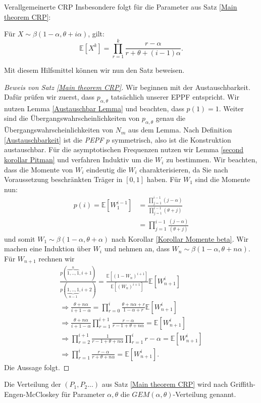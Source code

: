 \begin{section}{Verallgemeinerte CRP}
Insbesondere folgt für die Parameter aus Satz \ref{Main theorem CRP}: 
\begin{Korollar}
    \label{Korollar Momente beta}
    Für $X \sim \beta(1-\alpha,\theta + i\alpha)$, gilt:
    \[
    \mathbb{E}[X^k] = \prod_{r=1}^{k}\frac{r-\alpha}{r+\theta +(i-1)\alpha }.
    \]
\end{Korollar}
Mit diesem Hilfsmittel können wir nun den Satz beweisen.
\begin{proof}[Beweis von Satz \ref{Main theorem CRP}]
   Wir beginnen mit der Austauschbarkeit. Dafür prüfen wir zuerst, dass $p_{\alpha,\theta}$ tatsächlich unserer EPPF entspricht. Wir nutzen Lemma \ref{Austauschbar Lemma} und beachten, dass $p(1) = 1$. Weiter sind die Übergangswahrscheinlichkeiten von $p_{\alpha,\theta}$ genau die Übergangswahrscheinlichkeiten von $N_m$ aus dem Lemma. Nach Definition \ref{Austauschbarkeit} ist die \textit{PEPF} $p$ symmetrisch, also ist die Konstruktion austauschbar. Für die asymptotischen Frequenzen nutzen wir Lemma \ref{second korollar Pitman} und verfahren Induktiv um die $W_i$ zu bestimmen. Wir beachten, dass die Momente von $W_i$ eindeutig die $W_i$ charakterisieren, da Sie nach Voraussetzung beschränkten Träger in $[0,1]$ haben. Für $W_1$ sind die Momente nun:
    \begin{align*}
    p(i)= \mathbb{E}[W_1^{i-1}] &= \frac{\prod_{j=1}^{i-1}(j-\alpha)}{\prod_{j=1}^{i-1}(\theta+j)}\\
    &= \prod_{j=1}^{i-1}\frac{(j-\alpha)}{(\theta+j)}
    \end{align*}
und somit $W_1 \sim \beta(1-\alpha,\theta + \alpha)$ nach Korollar \ref{Korollar Momente beta}. Wir machen eine Induktion über $W_i$ und nehmen an, dass $W_n \sim \beta(1-\alpha,\theta+n\alpha)$. Für $W_{n+1}$ rechnen wir
    \begin{align*}
    \frac{p(\overbrace{1,..,1}^{n},i+1)}{p(\underbrace{1,..,1}_{n-1},i+2)}= \frac{\mathbb{E}[(1-W_n)^{i+1}]}{\mathbb{E}[(W_n)^{i+1}]}\mathbb{E}[W_{n+1}^i] \\
    \Rightarrow \frac{\theta + n\alpha}{i+1-\alpha}=  \prod_{r=0}^{i}\frac{\theta + n\alpha + r}{{1-\alpha + r}}\mathbb{E}[W_{n+1}^i]\\
    \Rightarrow \frac{\theta + n\alpha}{i+1-\alpha}\prod_{r=1}^{i+1}\frac{{r-\alpha }}{ r -1 + \theta + n\alpha }=  \mathbb{E}[W_{n+1}^i]\\
    \Rightarrow \prod_{r=2}^{i+1}\frac{1}{r -1 + \theta + n\alpha}\prod_{r=1}^{i}r-\alpha =  \mathbb{E}[W_{n+1}^i]\\
    \Rightarrow \prod_{r=1}^{i}\frac{r-\alpha}{r+\theta+n\alpha} = \mathbb{E}[W_{n+1}^i].
    \end{align*}
Die Aussage folgt.
\end{proof}
\begin{Definition}
Die Verteilung der $(P_1,P_2...)$ aus Satz \ref{Main theorem CRP} wird nach Griffith-Engen-McCloskey für Parameter $\alpha,\theta$ die $GEM(\alpha,\theta)$-Verteilung genannt.
\end{Definition}
\end{section}